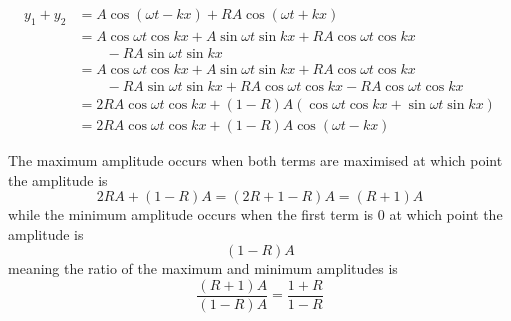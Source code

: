 \documentclass{article}
\begin{document}
\begin{align*}
  y_1 + y_2 & = A \cos (\omega t - k x) + R A \cos (\omega t + k x)                                         \\
            & = A \cos \omega t \cos k x + A \sin \omega t \sin k x + R A \cos \omega t \cos k x            \\
            & \qquad - R A \sin \omega t \sin k x                                                           \\
            & = A \cos \omega t \cos k x + A \sin \omega t \sin k x + R A \cos \omega t \cos k x            \\
            & \qquad - R A \sin \omega t \sin k x + R A \cos \omega t \cos k x - R A \cos \omega t \cos k x \\
            & = 2 R A \cos \omega t \cos k x + (1 - R) A (\cos \omega t \cos k x + \sin \omega t \sin k x)  \\
            & = 2 R A \cos \omega t \cos k x + (1 - R) A \cos (\omega t - k x)
\end{align*}

The maximum amplitude occurs when both terms are maximised at which point the amplitude is \[2 R A + (1 - R) A = (2 R + 1 - R) A = (R + 1) A\] while the minimum amplitude occurs when the first term is $0$ at which point the amplitude is \[(1 - R)A\] meaning the ratio of the maximum and minimum amplitudes is \[\frac{(R + 1) A}{(1 - R) A} = \frac{1 + R}{1 - R}\]

\subsection{}
\end{document}
